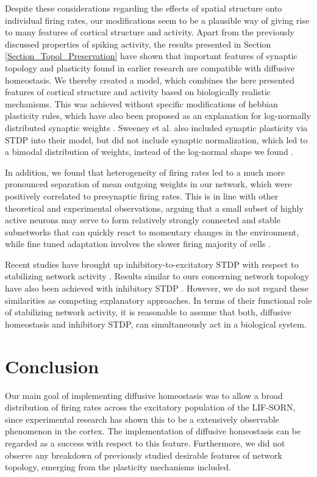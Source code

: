 \documentclass[10pt,letterpaper]{article}
\begin{document}
Despite these considerations regarding the effects of spatial structure onto individual firing rates, our modifications seem to be a plausible way of giving rise to many features of cortical structure and activity. Apart from the previously discussed properties of spiking activity, the results presented in Section \ref{Section_Topol_Preservation} have shown that important features of synaptic topology and plasticity found in earlier research are compatible with diffusive homeostasis. We thereby created a model, which combines the here presented features of cortical structure and activity based on biologically realistic mechanisms. This was achieved without specific modifications of hebbian plasticity rules, which have also been proposed as an explanation for log-normally distributed synaptic weights \cite{Koulakov_2009,Gilson_2011,Effenberger_2015}. Sweeney et al. also included synaptic plasticity via STDP into their model, but did not include synaptic normalization, which led to a bimodal distribution of weights, instead of the log-normal shape we found \cite{Sweeney_Paper}.

In addition, we found that heterogeneity of firing rates led to a much more pronounced separation of mean outgoing weights in our network, which were positively correlated to presynaptic firing rates. This is in line with other theoretical and experimental observations, arguing that a small subset of highly active neurons may serve to form relatively strongly connected and stable subnetworks that can quickly react to momentary changes in the environment, while fine tuned adaptation involves the slower firing majority of cells \cite{Buzsaki_Fir_Rates_2014,Yassin_Subnetworks_2010,Dragoi_2003}.

Recent studies have brought up inhibitory-to-excitatory STDP with respect to stabilizing network activity \cite{Vogels_2011,Luz_2012}. Results similar to ours concerning network topology have also been achieved with inhibitory STDP \cite{Effenberger_2015}. However, we do not regard these similarities as competing explanatory approaches. In terms of their functional role of stabilizing network activity, it is reasonable to assume that both, diffusive homeostasis and inhibitory STDP, can simultaneously act in a biological system. 

\section*{Conclusion}
Our main goal of implementing diffusive homeostasis was to allow a broad distribution of firing rates across the excitatory population of the LIF-SORN, since experimental research has shown this to be a extensively observable phenomenon in the cortex. The implementation of diffusive homeostasis can be regarded as a success with respect to this feature. Furthermore, we did not observe any breakdown of previously studied desirable features of network topology, emerging from the plasticity mechanisms included.
\end{document}
